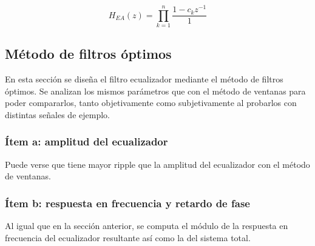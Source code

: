 	\begin{equation*}
			H_{EA}(z) = \prod^n_{k=1} \frac{1-c_k z^{-1}}{1} 
			\label{eq:prod_hea}
	\end{equation*}



\subsection{Método de filtros óptimos}

En esta sección se diseña el filtro ecualizador mediante el método de filtros óptimos. Se analizan los mismos parámetros que con el método de ventanas para poder compararlos, tanto objetivamente como subjetivamente al probarlos con distintas señales de ejemplo. \\
{\color{red}{Tal vez hay que sacar lo de las señales de ejemplo...}}


	\subsubsection{Ítem a: amplitud del ecualizador}

	
	
	Puede verse que tiene mayor ripple que la amplitud del ecualizador con el método de ventanas.


	\subsubsection{Ítem b: respuesta en frecuencia y retardo de fase}

	Al igual que en la sección anterior, se computa el módulo de la respuesta en frecuencia del ecualizador resultante así como la del sistema total.\\
	
	
